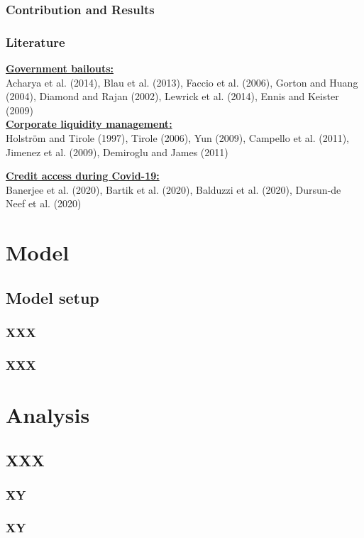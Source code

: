 \documentclass[13.8pt]{beamer}
\begin{document}
\begin{frame}
\frametitle{Contribution and Results}
\end{frame}

\begin{frame}
\frametitle{Literature}
\textbf{\large\underline{Government bailouts:}}\\ 
Acharya et al. (2014), Blau et al. (2013), Faccio et al. (2006), Gorton and Huang (2004), Diamond and Rajan (2002), Lewrick et al. (2014), Ennis and Keister (2009) \\
\vspace{0.5cm}
\textbf{\large\underline{Corporate liquidity management:}}\\
Holström and Tirole (1997), Tirole (2006), Yun (2009), Campello et al. (2011), Jimenez et al. (2009), Demiroglu and James (2011)


\vspace{1cm}
\textbf{\large\underline{Credit access during Covid-19:}}\\
Banerjee et al. (2020), Bartik et al. (2020), Balduzzi et al. (2020), Dursun-de Neef et al. (2020)


\end{frame}


\section{Model}
\subsection{Model setup}
\begin{frame}
\frametitle{XXX}
\end{frame}

\begin{frame}
\frametitle{XXX}
\end{frame}

\section{Analysis}
\subsection{XXX}
\begin{frame}
\frametitle{XY}
\end{frame}

\begin{frame}
\frametitle{XY}
\end{frame}
\end{document}
